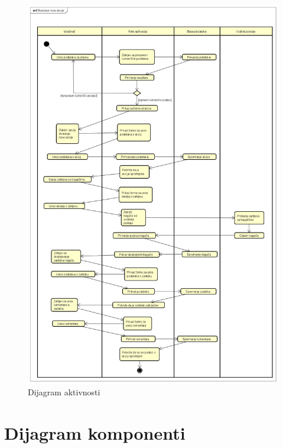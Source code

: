 			\begin{figure}[H]
				\includegraphics[scale=0.4]{dijagrami/DijagramAkt.png} 
				\centering
				\caption{Dijagram aktivnosti}
				\label{fig:promjene}
			\end{figure}
			
			\eject
		\section{Dijagram komponenti}
		
